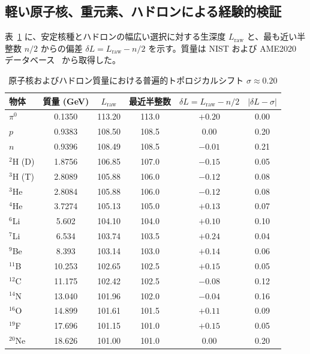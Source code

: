 \documentclass[12pt,a4paper]{article}
\begin{document}
	\subsection{軽い原子核、重元素、ハドロンによる経験的検証}
	
	表~\ref{tab:nuclear_sigma} に、安定核種とハドロンの幅広い選択に対する生深度 \(L_{\mathrm{raw}}\) と、最も近い半整数 \(n/2\) からの偏差 \(\delta L = L_{\mathrm{raw}} - n/2\) を示す。質量は NIST および AME2020 データベース~\cite{AME2020} から取得した。
	
	\begin{table}[htbp]
		\centering
		\caption{原子核およびハドロン質量における普遍的トポロジカルシフト \(\sigma \approx 0.20\)}
		\label{tab:nuclear_sigma}
		\small
		\begin{tabular}{l c c c c c}
			\toprule
			物体 & 質量 (GeV) & \(L_{\mathrm{raw}}\) & 最近半整数 & \(\delta L = L_{\mathrm{raw}} - n/2\) & \(|\delta L - \sigma|\) \\
			\midrule
			\(\pi^0\) & 0.1350 & 113.20 & 113.0 & \(+0.20\) & 0.00 \\
			\(p\)     & 0.9383 & 108.50 & 108.5 & \(0.00\)  & 0.20 \\
			\(n\)     & 0.9396 & 108.49 & 108.5 & \(-0.01\) & 0.21 \\
			\(^2\)H (D) & 1.8756 & 106.85 & 107.0 & \(-0.15\) & 0.05 \\
			\(^3\)H (T) & 2.8089 & 105.88 & 106.0 & \(-0.12\) & 0.08 \\
			\(^3\)He & 2.8084 & 105.88 & 106.0 & \(-0.12\) & 0.08 \\
			\(^4\)He & 3.7274 & 105.13 & 105.0 & \(+0.13\) & 0.07 \\
			\(^6\)Li & 5.602  & 104.10 & 104.0 & \(+0.10\) & 0.10 \\
			\(^7\)Li & 6.534  & 103.74 & 103.5 & \(+0.24\) & 0.04 \\
			\(^9\)Be & 8.393  & 103.14 & 103.0 & \(+0.14\) & 0.06 \\
			\(^{11}\)B & 10.253 & 102.65 & 102.5 & \(+0.15\) & 0.05 \\
			\(^{12}\)C & 11.175 & 102.42 & 102.5 & \(-0.08\) & 0.12 \\
			\(^{14}\)N & 13.040 & 101.96 & 102.0 & \(-0.04\) & 0.16 \\
			\(^{16}\)O & 14.899 & 101.61 & 101.5 & \(+0.11\) & 0.09 \\
			\(^{19}\)F & 17.696 & 101.15 & 101.0 & \(+0.15\) & 0.05 \\
			\(^{20}\)Ne & 18.626 & 101.00 & 101.0 & \(0.00\)  & 0.20 \\

\end{tabular}
\end{table}
\end{document}
